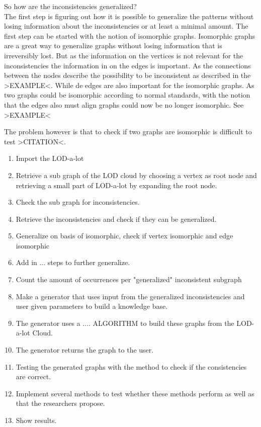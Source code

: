 \documentclass{article}
\begin{document}
So how are the inconsistencies generalized?\\
The first step is figuring out how it is possible to generalize the patterns without losing information about the inconsistencies or at least a minimal amount. The first step can be started with the notion of isomorphic graphs. Isomorphic graphs are a great way to generalize graphs without losing information that is irreversibly lost. But as the information on the vertices is not relevant for the inconsistencies the information in on the edges is important. As the connections between the nodes describe the possibility to be inconsistent as described in the >EXAMPLE<. While de edges are also important for the isomorphic graphs. As two graphs could be isomorphic according to normal standards, with the notion that the edges also must align graphs could now be no longer isomorphic. See >EXAMPLE<

The problem however is that to check if two graphs are isomorphic is difficult to test >CITATION<. 





\begin{enumerate}
	\item Import the LOD-a-lot
	\item Retrieve a sub graph of the LOD cloud by choosing a vertex as root node and retrieving a small part of LOD-a-lot by expanding the root node.
	\item Check the sub graph for inconsistencies. 
	\item Retrieve the inconsistencies and check if they can be generalized.
	\item Generalize on basis of isomorphic, check if vertex isomorphic and edge isomorphic
	\item Add in ... steps to further generalize.
	\item Count the amount of occurrences per "generalized" inconsistent subgraph
	\item Make a generator that uses input from the generalized inconsistencies and user given parameters to build a knowledge base.
	\item The generator uses a .... ALGORITHM to build these graphs from the LOD-a-lot Cloud.
	\item The generator returns the graph to the user.
	\item Testing the generated graphs with the method to check if the consistencies are correct. 
	\item Implement several methods to test whether these methods perform as well as that the researchers propose.
	\item Show results.
\end{enumerate}
\end{document}
